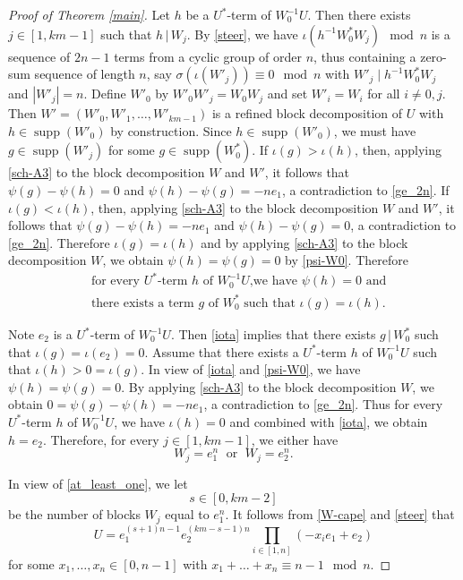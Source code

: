 \documentclass[11pt]{amsart}
\theoremstyle{definition}
\DeclareMathOperator{\supp}{supp}
\newcommand{\be}{\begin{equation}}
\newcommand{\ee}{\end{equation}}
\renewcommand{\t}{\, | \,}
\numberwithin{equation}{section}
\begin{document}
\begin{proof}[Proof of Theorem \ref{main}]
	
	Let $h$ be a $U^*$-term of $W_0^{-1}U$. Then there exists $j\in [1, km-1]$ such that $h\t W_j$. By \eqref{steer}, we have $\iota(h^{-1} W_0^{*} W_j)\mod n$ is a sequence of $2n-1$ terms from a cyclic group of order $n$, thus containing a zero-sum sequence of length $n$, say $\sigma(\iota(W'_j))\equiv 0\mod n$ with $W'_j\mid h^{-1} W_0^* W_j$ and  $|W'_j|=n$. Define $W'_0$ by $W'_0 W'_j=W_0 W_j$ and set $W'_i=W_i$ for all $i\neq 0,j$. Then $W'=(W'_0,W'_1,\ldots,W'_{km-1})$ is a refined block decomposition of $U$ with $h\in\supp(W'_0)$ by construction. Since $h\in \supp(W'_0)$, we must have $g\in\supp(W'_j)$ for some $g\in \supp(W_0^{*})$.
	If $\iota(g)>\iota(h)$, then, applying \ref{sch-A3} to the block decomposition $W$ and $W'$, it follows that $\psi(g)-\psi(h)=0$ and $\psi(h)-\psi(g)=-ne_1$, a contradiction to \eqref{ge_2n}.
	If $\iota(g)<\iota(h)$,  then, applying \ref{sch-A3} to the block decomposition $W$ and $W'$, it follows that $\psi(g)-\psi(h)=-ne_1$ and $\psi(h)-\psi(g)=0$, a contradiction to \eqref{ge_2n}. Therefore $\iota(g)=\iota(h)$ and by applying \ref{sch-A3} to the block decomposition $W$, we obtain $\psi(h)=\psi(g)=0$ by \eqref{psi-W0}. Therefore
	\be\label{iota}
	\begin{aligned}
	&\text{ for every $U^*$-term $h$ of $W_0^{-1}U$,we have $\psi(h)=0$ and }\\
	& \text{ there exists a term $g$ of $W_0^*$ such that $\iota(g)=\iota(h)$.}
	\end{aligned}
	\ee
	
	Note $e_2$ is a $U^*$-term of $W_0^{-1}U$. Then \eqref{iota} implies that there exists $g\t W_0^*$ such that $\iota(g)=\iota(e_2)=0$. 
Assume that there exists a $U^*$-term $h$ of $W_0^{-1}U$ such that $\iota(h)>0=\iota(g)$. In view of \eqref{iota} and \eqref{psi-W0}, we have $\psi(h)=\psi(g)=0$.
 By applying \ref{sch-A3} to the block decomposition $W$, we obtain $0=\psi(g)-\psi(h)=-ne_1$, a contradiction to \eqref{ge_2n}.
Thus for every $U^*$-term $h$ of $W_0^{-1}U$, we have $\iota(h)=0$
and combined with \eqref{iota}, we obtain $h=e_2$.
Therefore, for every $j\in [1,km-1]$, we either have \be\label{reeper}W_j=e_1^n\;\mbox{ or } \;W_j=e_2^n.\ee
	
	In view of \eqref{at_least_one}, we 
	let $$s\in [0,km-2]$$ be the number of blocks $W_j$ equal to $e_1^n$. It follows from \eqref{W-cape} and \eqref{steer} that
	\be\label{Ustarter}U=e_1^{(s+1)n-1} e_2^{(km-s-1)n}
	\prod_{i\in [1,n]}(-x_i e_1+e_2)\ee for some $x_1,\ldots, x_{n}\in [0,n-1]$ with $x_1+\ldots+ x_{n}\equiv n-1\mod n$. 
	

\end{proof}
\end{document}
